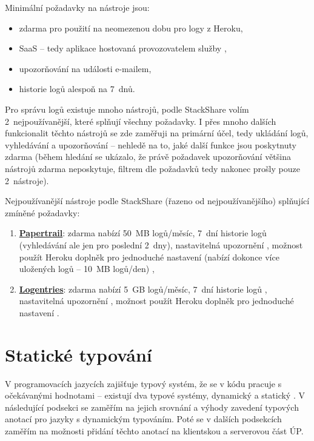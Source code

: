 Minimální požadavky na nástroje jsou:
\begin{itemize}
    \item zdarma pro použití na neomezenou dobu pro logy z Heroku,
    \item SaaS -- tedy aplikace hostovaná provozovatelem služby \cite{oracle-saas},
    \item upozorňování na události e-mailem,
    \item historie logů alespoň na 7~dnů.
\end{itemize}

Pro správu logů existuje mnoho nástrojů, podle StackShare \cite{stackshare-log} volím 2~nejpoužívanější, které splňují všechny požadavky. I přes mnoho dalších funkcionalit těchto nástrojů se zde zaměřuji na primární účel, tedy ukládání logů, vyhledávání a upozorňování -- nehledě na to, jaké další funkce jsou poskytnuty zdarma (během hledání se ukázalo, že právě požadavek upozorňování většina nástrojů zdarma neposkytuje, filtrem dle požadavků tedy nakonec prošly pouze 2~nástroje).

Nejpoužívanější nástroje podle StackShare (řazeno od nejpoužívanějšího) \cite{stackshare-log} splňující zmíněné požadavky:
\begin{enumerate}
    \item \href{https://www.papertrail.com/}{\textbf{Papertrail}}: zdarma nabízí 50~MB logů/měsíc, 7~dní historie logů (vyhledávání ale jen pro poslední 2~dny), nastavitelná upozornění \cite{papertrail-pricing}, možnost použít Heroku doplněk pro jednoduché nastavení (nabízí dokonce více uložených logů -- 10~MB logů/den) \cite{heroku-papertrail},
    \item \href{https://logentries.com/}{\textbf{Logentries}}: zdarma nabízí 5~GB logů/měsíc, 7~dní historie logů \cite{logentries-pricing}, nastavitelná upozornění \cite{logentries-pricing2}, možnost použít Heroku doplněk pro jednoduché nastavení \cite{heroku-logentries}.
\end{enumerate}


\section{Statické typování}\label{sec:staticketypovani}

V programovacích jazycích zajišťuje typový systém, že se v kódu pracuje s očekávanými hodnotami -- existují dva typové systémy, dynamický a statický \cite{types-study}. V následující podsekci se zaměřím na jejich srovnání a výhody zavedení typových anotací pro jazyky s dynamickým typováním. Poté se v dalších podsekcích zaměřím na možnosti přidání těchto anotací na klientskou a serverovou část ÚP.

